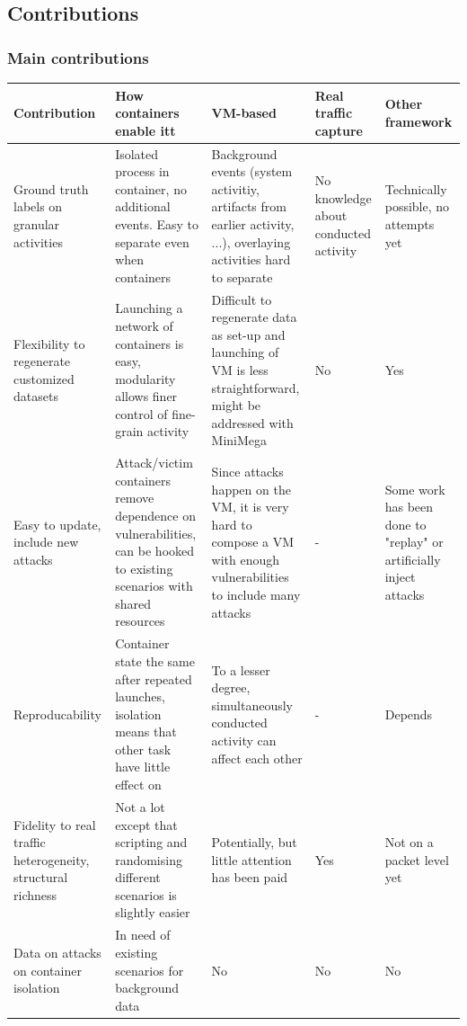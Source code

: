 \documentclass{article}
\begin{document}
\subsection{Contributions}

\subsubsection{Main contributions}


\begin{tabular}{p{3cm}|p{3cm}|p{3cm}|p{3cm}|p{3cm}}
Contribution&How containers enable itt& VM-based & Real traffic capture &Other framework  \\ \hline

Ground truth labels on granular activities & Isolated process in container, no additional events. Easy to separate even when containers & Background events (system activitiy, artifacts from earlier activity, ...), overlaying activities hard to separate & No knowledge about conducted activity & Technically possible, no attempts yet \\ \hline

Flexibility to regenerate customized datasets & Launching a network of containers is easy, modularity allows finer control of fine-grain activity  & Difficult to regenerate data as set-up and launching of VM is less straightforward, might be addressed with MiniMega & No & Yes \\ \hline

Easy to update, include new attacks & 
Attack/victim containers remove dependence on vulnerabilities, can be hooked to existing scenarios with shared resources & Since attacks happen on the VM, it is very hard to compose a VM with enough vulnerabilities to include many attacks & - & Some work has been done to "replay" or artificially inject attacks  \\ \hline

Reproducability & Container state the same after repeated launches, isolation means that other task have little effect on  & To a lesser degree, simultaneously conducted activity can affect each other & - & Depends \\ \hline

Fidelity to real traffic heterogeneity, structural richness & Not a lot except that scripting and randomising different scenarios is slightly easier  & Potentially, but little attention has been paid & Yes & Not on a packet level yet \\ \hline \hline


Data on attacks on container isolation & In need of existing scenarios for background data & No & No & No \\ \hline







\end{tabular}
\end{document}
